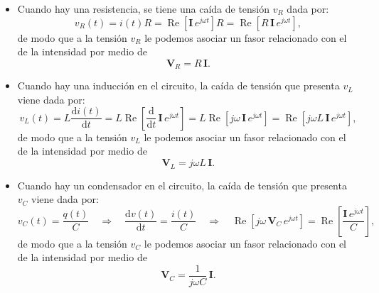 \begin{itemize}
  \item Cuando hay una resistencia, se tiene una caída de tensión $v_R$ dada por:
    \[
    v_R(t) = i(t) R = \operatorname{Re}\left[\mathbf{I}\, e^{j\omega t}\right] R = \operatorname{Re}\left[R\,\mathbf{I}\, e^{j\omega t}\right],
    \]
    de modo que a la tensión $v_R$ le podemos asociar un fasor relacionado con el de la intensidad por medio de
    \begin{equation}
      \label{eq:FasorVR}
      \mathbf{V}_R = R\, \mathbf{I}.
    \end{equation}

  \item Cuando hay una inducción en el circuito, la caída de tensión que presenta $v_L$ viene dada por:
    \[
    v_L(t) = L \frac{\text{d}i(t)}{\text{d}t} = L \operatorname{Re} \left[\frac{\text{d}}{\text{d}t}\, \mathbf{I}\, e^{j\omega t}\right] = L  \operatorname{Re} \left[j\omega\, \mathbf{I}\, e^{j\omega t}\right] =   \operatorname{Re} \left[j\omega L\, \mathbf{I} \,e^{j\omega t}\right],
    \]
    de modo que a la tensión $v_L$ le podemos asociar un fasor relacionado con el de la intensidad por medio de
    \begin{equation}
      \label{eq:FasorVL}
      \mathbf{V}_L = j \omega L\,\mathbf{I}.
    \end{equation}

  \item Cuando hay un condensador en el circuito, la caída de tensión que presenta $v_C$ viene dada por:
    \[
    v_C(t) = \frac{q(t)}{C} \quad \Longrightarrow \quad  \frac{\text{d}v(t)}{\text{d}t} = \frac{i(t)}{C}  \quad \Longrightarrow \quad \operatorname{Re}\left[j\omega\,\mathbf{V}_C\,e^{j\omega t}\right] = \operatorname{Re} \left[\frac{\mathbf{I}\, e^{j\omega t}}{C}\right],
    \]
    de modo que a la tensión $v_C$ le podemos asociar un fasor relacionado con el de la intensidad por medio de
    \begin{equation}
      \label{eq:FasorVC}
      \mathbf{V}_C = \frac{1}{j \omega C}\,\mathbf{I}.
    \end{equation}
\end{itemize}

